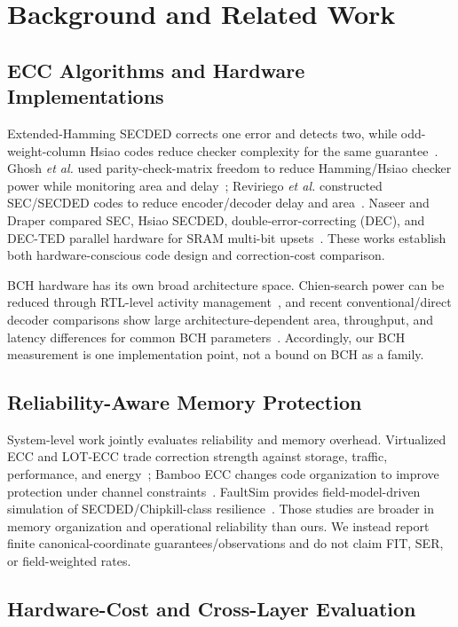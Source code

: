 \section{Background and Related Work}

\subsection{ECC Algorithms and Hardware Implementations}

Extended-Hamming SECDED corrects one error and detects two, while odd-weight-column Hsiao codes reduce checker complexity for the same guarantee~\cite{hsiao1970,chen1984review}. Ghosh \emph{et al.} used parity-check-matrix freedom to reduce Hamming/Hsiao checker power while monitoring area and delay~\cite{ghosh2004,ghosh2005}; Reviriego \emph{et al.} constructed SEC/SECDED codes to reduce encoder/decoder delay and area~\cite{reviriego2013}. Naseer and Draper compared SEC, Hsiao SECDED, double-error-correcting (DEC), and DEC-TED parallel hardware for SRAM multi-bit upsets~\cite{naseer2008}. These works establish both hardware-conscious code design and correction-cost comparison.

BCH hardware has its own broad architecture space. Chien-search power can be reduced through RTL-level activity management~\cite{wong2011}, and recent conventional/direct decoder comparisons show large architecture-dependent area, throughput, and latency differences for common BCH parameters~\cite{lagendijk2026}. Accordingly, our BCH measurement is one implementation point, not a bound on BCH as a family.

\subsection{Reliability-Aware Memory Protection}

System-level work jointly evaluates reliability and memory overhead. Virtualized ECC and LOT-ECC trade correction strength against storage, traffic, performance, and energy~\cite{yoon2010,udipi2012}; Bamboo ECC changes code organization to improve protection under channel constraints~\cite{kim2015bamboo}. FaultSim provides field-model-driven simulation of SECDED/Chipkill-class resilience~\cite{nair2016faultsim}. Those studies are broader in memory organization and operational reliability than ours. We instead report finite canonical-coordinate guarantees/observations and do not claim FIT, SER, or field-weighted rates.

\subsection{Hardware-Cost and Cross-Layer Evaluation}

